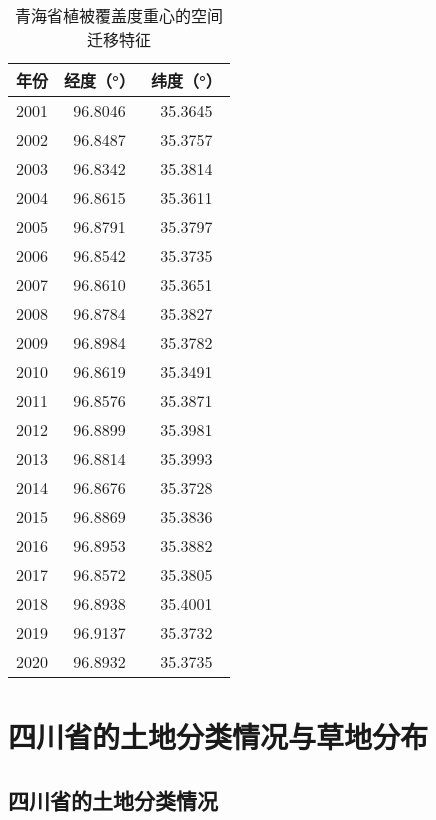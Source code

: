 \documentclass[AutoFakeBold]{LZUThesis-PgD&PhD}
\begin{document}
\begin{table}[H]
        \centering
    \begin{tabular}{|c|c|c|}
        \hline
        年份 & 经度（°） & 纬度（°） \\
        \hline
        2001 & 96.8046 & 35.3645 \\
        2002 & 96.8487 & 35.3757 \\
        2003 & 96.8342 & 35.3814 \\
        2004 & 96.8615 & 35.3611 \\
        2005 & 96.8791 & 35.3797 \\
        2006 & 96.8542 & 35.3735 \\
        2007 & 96.8610 & 35.3651 \\
        2008 & 96.8784 & 35.3827 \\
        2009 & 96.8984 & 35.3782 \\
        2010 & 96.8619 & 35.3491 \\
        2011 & 96.8576 & 35.3871 \\
        2012 & 96.8899 & 35.3981 \\
        2013 & 96.8814 & 35.3993 \\
        2014 & 96.8676 & 35.3728 \\
        2015 & 96.8869 & 35.3836 \\
        2016 & 96.8953 & 35.3882 \\
        2017 & 96.8572 & 35.3805 \\
        2018 & 96.8938 & 35.4001 \\
        2019 & 96.9137 & 35.3732 \\
        2020 & 96.8932 & 35.3735 \\
        \hline
    \end{tabular}
    
    
    
    
    
            \caption{青海省植被覆盖度重心的空间迁移特征}




    \end{table}




    \section{四川省的土地分类情况与草地分布}

    \subsection{四川省的土地分类情况}
		
\end{document}
